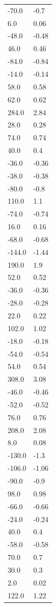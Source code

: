 \begin{longtable}{ll}
-70.0 & -0.7 \\
6.0 & 0.06 \\
-48.0 & -0.48 \\
46.0 & 0.46 \\
-84.0 & -0.84 \\
-14.0 & -0.14 \\
58.0 & 0.58 \\
62.0 & 0.62 \\
284.0 & 2.84 \\
28.0 & 0.28 \\
74.0 & 0.74 \\
40.0 & 0.4 \\
-36.0 & -0.36 \\
-38.0 & -0.38 \\
-80.0 & -0.8 \\
110.0 & 1.1 \\
-74.0 & -0.74 \\
16.0 & 0.16 \\
-68.0 & -0.68 \\
-144.0 & -1.44 \\
190.0 & 1.9 \\
52.0 & 0.52 \\
-36.0 & -0.36 \\
-28.0 & -0.28 \\
22.0 & 0.22 \\
102.0 & 1.02 \\
-18.0 & -0.18 \\
-54.0 & -0.54 \\
54.0 & 0.54 \\
308.0 & 3.08 \\
-46.0 & -0.46 \\
-52.0 & -0.52 \\
76.0 & 0.76 \\
208.0 & 2.08 \\
8.0 & 0.08 \\
-130.0 & -1.3 \\
-106.0 & -1.06 \\
-90.0 & -0.9 \\
98.0 & 0.98 \\
-66.0 & -0.66 \\
-24.0 & -0.24 \\
40.0 & 0.4 \\
-58.0 & -0.58 \\
70.0 & 0.7 \\
30.0 & 0.3 \\
2.0 & 0.02 \\
122.0 & 1.22 \\

\end{longtable}
